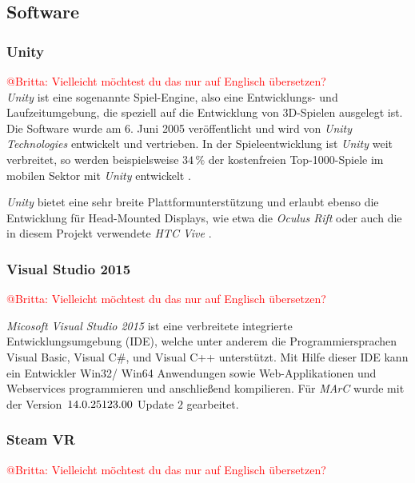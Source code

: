 \subsection{Software}


\subsubsection{Unity}\label{sec:unity}
\textcolor{red}{@Britta: Vielleicht möchtest du das nur auf Englisch übersetzen?}\\

\emph{Unity} ist eine sogenannte Spiel-Engine, also eine Entwicklungs- und Laufzeitumgebung, die speziell auf die Entwicklung von 3D-Spielen ausgelegt ist. Die Software wurde am 6. Juni 2005 veröffentlicht \cite{haas2014history} und wird von \textit{Unity Technologies} \cite{website:Unity} entwickelt und vertrieben. In der Spieleentwicklung ist \textit{Unity} weit verbreitet, so werden beispielsweise $34\,\%$ der kostenfreien Top-1000-Spiele im mobilen Sektor mit \textit{Unity} entwickelt \cite{website:UnityPR}.

\emph{Unity} bietet eine sehr breite Plattformunterstützung \cite{website:UnityMultiPlatform} und erlaubt ebenso die Entwicklung für Head-Mounted Displays, wie etwa die \textit{Oculus Rift} \cite{website:UnityVRoverview} oder auch die in diesem Projekt verwendete \textit{HTC Vive} \cite{website:UnityVRoverview}.


\subsubsection{Visual Studio 2015}\label{sec:VisualStudio}
\textcolor{red}{@Britta: Vielleicht möchtest du das nur auf Englisch übersetzen?}

\textit{Micosoft Visual Studio 2015} ist eine verbreitete integrierte Entwicklungsumgebung (IDE), welche unter anderem die Programmiersprachen Visual Basic, Visual C$\#$, und Visual C++ unterstützt. Mit Hilfe dieser IDE kann ein Entwickler Win32/ Win64 Anwendungen sowie Web-Applikationen und Webservices \cite{website:VisuStud} programmieren und anschließend kompilieren. Für \textit{MArC} wurde mit der Version~$14.0.\-25123.00$ Update $2$ gearbeitet.




\subsubsection{Steam VR}
\textcolor{red}{@Britta: Vielleicht möchtest du das nur auf Englisch übersetzen?}\\

